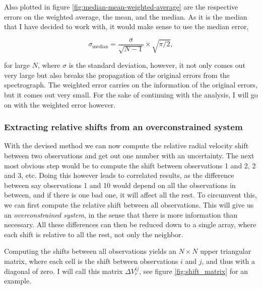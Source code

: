     Also plotted in figure \ref{fig:median-mean-weighted-average} are the respective errors on the weighted average, the mean, and the median. As it is the median that I have decided to work with, it would make sense to use the median error, 
    
    $$
        \sigma_{\text{median}} = \frac{\sigma}{\sqrt{N-1}} \times \sqrt{\pi/2},
    $$
    
    for large $N$, where $\sigma$ is the standard deviation, however, it not only comes out very large but also breaks the propagation of the original errors from the spectrograph. The weighted error carries on the information of the original errors, but it comes out very small. For the sake of continuing with the analysis, I will go on with the weighted error however.
    
    \subsubsection{Extracting relative shifts from an overconstrained system}
    
    With the devised method we can now compute the relative radial velocity shift between two observations and get out one number with an uncertainty. The next most obvious step would be to compute the shift between observations 1 and 2, 2 and 3, etc. Doing this however leads to correlated results, as the difference between say observations 1 and 10 would depend on all the observations in between, and if there is one bad one, it will affect all the rest. To circumvent this, we can first compute the relative shift between all observations. This will give us an \emph{overconstrained system}, in the sense that there is more information than necessary. All these differences can then be reduced down to a single array, where each shift is relative to all the rest, not only the neighbor. 
    
    Computing the shifts between all observations yields an $N\times N$ upper triangular matrix, where each cell is the shift between observations $i$ and $j$, and thus with a diagonal of zero. I will call this matrix $\Delta V_r^{ij}$, see figure \ref{fig:shift_matrix} for an example.
    
